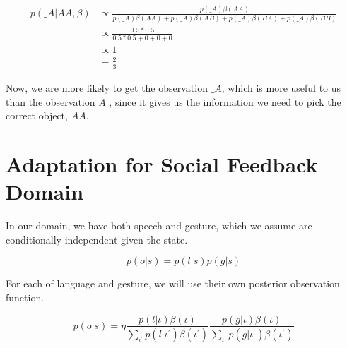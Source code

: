 \documentclass{article}
\begin{document}
\begin{align*}
	p(\_A|AA, \beta) &\propto \frac{ p(\_A)\beta(AA) }{ p(\_A)\beta(AA) + p(\_A)\beta(AB) + p(\_A)\beta(BA) + p(\_A)\beta(BB)} \\
	&\propto \frac{0.5 * 0.5}{0.5 * 0.5 + 0 + 0 + 0} \\
	&\propto 1 \\
	&= \frac{2}{3}
\end{align*}
 
Now, we are more likely to get the observation $\_A$, which is more useful to us than the observation $A\_$, since it gives us the information we need to pick the correct object, $AA$. 


\section{Adaptation for Social Feedback Domain}


In our domain, we have both speech and gesture, which we assume are conditionally independent given the state. 

$$p(o|s) = p(l|s)p(g|s)$$

For each of language and gesture, we will use their own posterior observation function. 


$$p(o|s) = \eta \frac{p(l|\iota) \beta(\iota)}{\sum_{\iota^\prime} p(l|\iota^\prime)\beta(\iota^\prime)} \frac{p(g|\iota) \beta(\iota)}{\sum_{\iota^\prime} p(g|\iota^\prime)\beta(\iota^\prime)}$$
\end{document}
